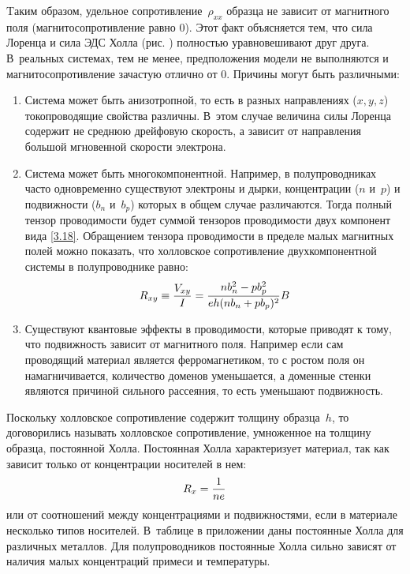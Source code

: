 Tаким образом, удельное сопротивление~$\rho_{xx}$ образца не зависит от
магнитного поля (магнитосопротивление равно 0). Этот факт объясняется тем, что
сила Лоренца и сила ЭДС Холла (рис. ) полностью
уравновешивают друг друга. В~реальных системах, тем не менее, предположения
модели не выполняются и магнитосопротивление зачастую отлично от 0. Причины
могут быть различными:
\begin{enumerate}
\item Система может быть анизотропной, то есть в разных направлениях ($x,y,z$)
токопроводящие свойства различны. В~этом случае величина силы Лоренца содержит
не среднюю дрейфовую скорость, а зависит от направления большой мгновенной
скорости электрона.

\item Система может быть многокомпонентной. Например, в полупроводниках часто
одновременно существуют электроны и дырки, концентрации ($n$ и~$p$) и
подвижности ($b_n$ и~$b_p$) которых в общем случае различаются. Тогда полный
тензор проводимости будет суммой тензоров проводимости двух компонент вида
\eqref{3.18}. Обращением тензора проводимости в пределе малых магнитных полей
можно показать, что холловское сопротивление двухкомпонентной системы в
полупроводнике равно:
\begin{equation}
	R_{xy}\equiv \frac{V_{xy}}{I}=\frac{nb_n^2-pb_p^2}{eh(nb_n+pb_p)^2}B
	\eqmark{3.21}
\end{equation}

\item Существуют квантовые эффекты в проводимости, которые приводят к тому, что
подвижность зависит от магнитного поля. Например если сам проводящий материал
является ферромагнетиком, то с ростом поля он намагничивается, количество
доменов уменьшается, а доменные стенки являются причиной сильного рассеяния, то
есть уменьшают подвижность.
\end{enumerate}

Поскольку холловское сопротивление содержит толщину образца~$h$, то договорились
называть холловское сопротивление, умноженное на толщину образца, постоянной
Холла. Постоянная Холла характеризует материал, так как зависит только от
концентрации носителей в нем:
\begin{equation}
	R_x=\frac{1}{ne}
	\eqmark{HallConstant}
\end{equation}
или от соотношений между концентрациями и подвижностями, если в материале
несколько типов носителей. В~таблице в приложении даны постоянные Холла для
различных металлов. Для полупроводников постоянные Холла сильно зависят от
наличия малых концентраций примеси и температуры.

